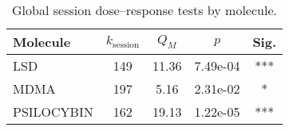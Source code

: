 \begin{table}[htbp]
  \centering
  \caption{Global session dose--response tests by molecule.}
  \label{tab:dr-global-by-molecule}
  \begin{tabular}{lcccc}
    \toprule
    Molecule & $k_{\text{session}}$ & $Q_M$ & $p$ & Sig. \\
    \midrule
    LSD & 149 & 11.36 & 7.49e-04 & *** \\
    MDMA & 197 & 5.16 & 2.31e-02 & * \\
    PSILOCYBIN & 162 & 19.13 & 1.22e-05 & *** \\
    \bottomrule
  \end{tabular}
\end{table}
